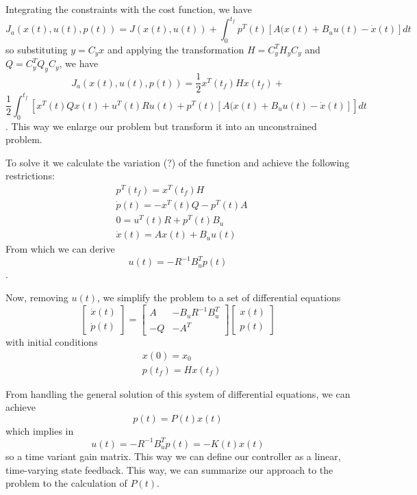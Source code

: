 Integrating the constraints with the cost function, we have \[
    J_a(x(t),u(t),p(t)) = J(x(t),u(t)) + \int_0^{t_f}p^{T}(t)\left[ A(x(t) + B_uu(t) - \dot{x}(t) \right] dt
\] so substituting $y=C_yx$ and applying the transformation $H=C_y^{T}H_yC_y$ and $Q=C_y^{T}Q_yC_y$, we have \[
    J_a(x(t),u(t),p(t)) = \frac{1}{2}x^T(t_f)Hx(t_f) +
\] \[
\frac{1}{2}\int_{0}^{t_f}\left[ x^{T}(t)Qx(t) + u^T(t)Ru(t) + p^{T}(t)\left[ A(x(t) + B_uu(t) - \dot{x}(t) \right] \right] dt
\]. This way we enlarge our problem but transform it into an unconstrained problem.

To solve it we calculate the variation (?) of the function and achieve the following restrictions: 
\begin{equation*}
\begin{split}
    & p^{T}(t_f) = x^T(t_f)H \\
    & \dot{p}(t) = -x^T(t)Q - p^T(t)A \\
    & 0 = u^T(t)R + p^T(t)B_u \\
    & \dot{x}(t) = Ax(t) + B_uu(t)
\end{split}
\end{equation*}
From which we can derive \[
    u(t) = -R^{-1}B_u^Tp(t)
\] .

Now, removing $u(t)$, we simplify the problem to a set of differential equations
\begin{equation}
    \begin{bmatrix} \dot{x}(t) \\ \dot{p}(t) \end{bmatrix} = \begin{bmatrix} A & -B_uR^{-1}B^{T}_u \\ -Q & -A^T \end{bmatrix} \begin{bmatrix} x(t) \\ p(t) \end{bmatrix} 
\end{equation}
with initial conditions
\begin{equation*}
    \begin{split}
	& x(0) = x_0 \\
	& p(t_f) = Hx(t_f)
    \end{split}
\end{equation*}

From handling the general solution of this system of differential equations, we can achieve \[
    p(t) = P(t)x(t)
\] which implies in \[
u(t) = -R^{-1}B_u^{T}p(t) = -K(t)x(t)
\] so a time variant gain matrix. This way we can define our controller as a linear, time-varying state feedback. This way, we can summarize our approach to the problem to the calculation of $P(t)$.

